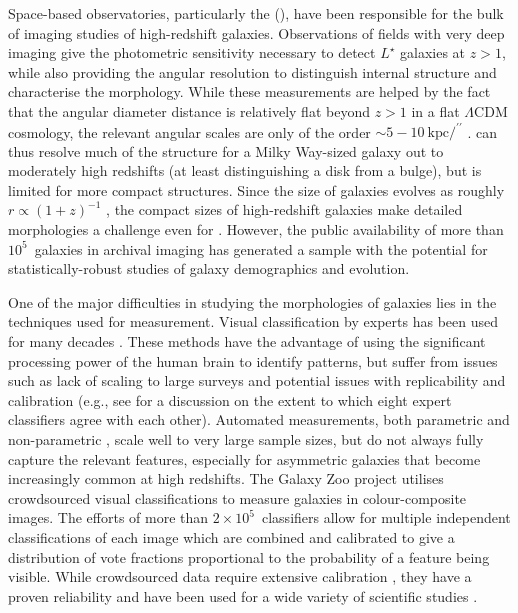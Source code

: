 \documentclass[a4paper,fleqn,usenatbib]{mnras}
\begin{document}
Space-based observatories, particularly the \hubble{} (\hst), have been
responsible for the bulk of imaging studies of high-redshift galaxies.
Observations of fields with very deep imaging
\citep[eg,][]{wil96,gia04,bec06,dav07,sco07,gro11} give the photometric
sensitivity necessary to detect $L^\star$ galaxies at $z>1$, while also
providing the angular resolution to distinguish internal structure and
characterise the morphology. While these measurements are helped by the fact
that the angular diameter distance is relatively flat beyond $z>1$ in a flat
$\Lambda$CDM cosmology, the relevant angular scales are only of the order
$\sim5-10~\mathrm{kpc}/^{\prime\prime}$ \citep{wri06}. \hst{} can thus resolve
much of the structure for a Milky Way-sized galaxy out to moderately high
redshifts (at least distinguishing a disk from a bulge), but is limited for
more compact structures. Since the size of galaxies evolves as roughly
$r\propto(1+z)^{-1}$ \citep{mao98,law12a}, the compact sizes of high-redshift
galaxies make detailed morphologies a challenge even for \hst{} \citep{che12}.
However, the public availability of more than $10^5$~galaxies in archival
imaging has generated a sample with the potential
for statistically-robust studies of galaxy demographics and evolution. 

One of the major difficulties in studying the morphologies of galaxies lies in
the techniques used for measurement. Visual classification by experts has been
used for many decades \citep[eg,][]{hub26,dev59,san61,van76,nai10,bai11,kar15}.
These methods have the advantage of using the significant processing power of
the human brain to identify patterns, but suffer from issues such as lack of
scaling to large surveys and potential issues with replicability and
calibration (e.g., see \citealt{lah95} for a discussion on the extent to which
eight expert classifiers agree with each other). Automated measurements, both
parametric \citep{pen02a,sim11,lac12} and non-parametric
\citep{abr03,con03,lot04,sca07,bam08,fre13}, scale well to very large sample
sizes, but do not always fully capture the relevant features, especially for
asymmetric galaxies that become increasingly common at high redshifts. The
Galaxy Zoo project \citep{lin08,for12} utilises crowdsourced visual classifications
to measure galaxies in colour-composite images. The efforts of more than
$2\times10^5$~classifiers allow for multiple independent classifications of
each image which are combined and calibrated to give a distribution of vote
fractions proportional to the probability of a feature being visible. While
crowdsourced data require extensive calibration \citep{bam09,wil13}, they have
a proven reliability and have been used for a wide variety of scientific
studies \citep[eg,][]{lan08,bam09,dar10,mas11c,ski12,sim13,sch14,wil15}. 
\end{document}
